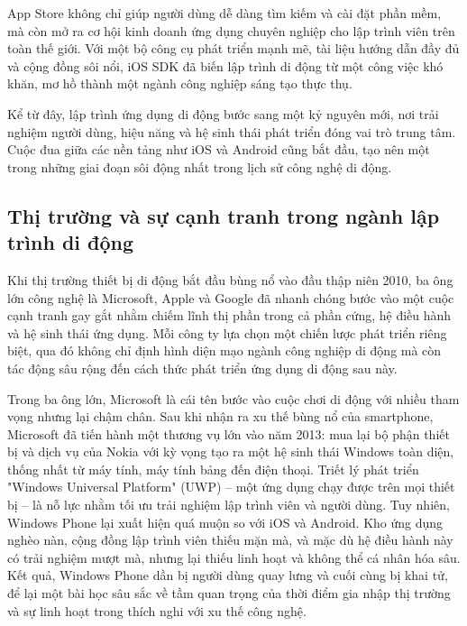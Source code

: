   \begin{flushleft}
  \hspace*{0.8cm}App Store không chỉ giúp người dùng dễ dàng tìm kiếm và cài đặt phần mềm, mà còn mở ra cơ hội kinh doanh ứng dụng chuyên nghiệp cho lập trình viên trên toàn thế giới. Với một bộ công cụ phát triển mạnh mẽ, tài liệu hướng dẫn đầy đủ và cộng đồng sôi nổi, iOS SDK đã biến lập trình di động từ một công việc khó khăn, mơ hồ thành một ngành công nghiệp sáng tạo thực thụ.
  \end{flushleft}
  
  \begin{flushleft}
  \hspace*{0.8cm}Kể từ đây, lập trình ứng dụng di động bước sang một kỷ nguyên mới, nơi trải nghiệm người dùng, hiệu năng và hệ sinh thái phát triển đóng vai trò trung tâm. Cuộc đua giữa các nền tảng như iOS và Android cũng bắt đầu, tạo nên một trong những giai đoạn sôi động nhất trong lịch sử công nghệ di động.
  \end{flushleft}

\subsection{Thị trường và sự cạnh tranh trong ngành lập trình di động}
\renewcommand{\labelitemi}{--}    
    \begin{flushleft}
        \hspace*{0.8cm}Khi thị trường thiết bị di động bắt đầu bùng nổ vào đầu thập niên 2010, ba ông lớn công nghệ là Microsoft, Apple và Google đã nhanh chóng bước vào một cuộc cạnh tranh gay gắt nhằm chiếm lĩnh thị phần trong cả phần cứng, hệ điều hành và hệ sinh thái ứng dụng. Mỗi công ty lựa chọn một chiến lược phát triển riêng biệt, qua đó không chỉ định hình diện mạo ngành công nghiệp di động mà còn tác động sâu rộng đến cách thức phát triển ứng dụng di động sau này.
    \end{flushleft}

    \begin{flushleft}
      \hspace*{0.8cm}Trong ba ông lớn, Microsoft là cái tên bước vào cuộc chơi di động với nhiều tham vọng nhưng lại chậm chân. Sau khi nhận ra xu thế bùng nổ của smartphone, Microsoft đã tiến hành một thương vụ lớn vào năm 2013: mua lại bộ phận thiết bị và dịch vụ của Nokia với kỳ vọng tạo ra một hệ sinh thái Windows toàn diện, thống nhất từ máy tính, máy tính bảng đến điện thoại. Triết lý phát triển "Windows Universal Platform" (UWP) – một ứng dụng chạy được trên mọi thiết bị – là nỗ lực nhằm tối ưu trải nghiệm lập trình viên và người dùng. Tuy nhiên, Windows Phone lại xuất hiện quá muộn so với iOS và Android. Kho ứng dụng nghèo nàn, cộng đồng lập trình viên thiếu mặn mà, và mặc dù hệ điều hành này có trải nghiệm mượt mà, nhưng lại thiếu linh hoạt và không thể cá nhân hóa sâu. Kết quả, Windows Phone dần bị người dùng quay lưng và cuối cùng bị khai tử, để lại một bài học sâu sắc về tầm quan trọng của thời điểm gia nhập thị trường và sự linh hoạt trong thích nghi với xu thế công nghệ.
    \end{flushleft}

